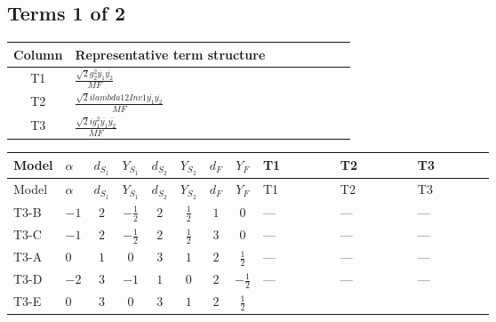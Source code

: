 \documentclass[8pt]{article}
\begin{document}
\begin{landscape}
\subsection*{Terms 1 of 2}
\begin{center}
\begin{tabular}{@{}c >{\raggedright\arraybackslash}p{0.82\linewidth}@{}}
\toprule
Column & Representative term structure \\
\midrule
T1 & \(\displaystyle \frac{\sqrt{2} g_{2}^{2} \overline{y_{1}} \overline{y_{2}}}{MF}\) \\
\midrule
T2 & \(\displaystyle \frac{\sqrt{2} i lambda12Inv1 \overline{y_{1}} \overline{y_{2}}}{MF}\) \\
\midrule
T3 & \(\displaystyle \frac{\sqrt{2} i g_{1}^{2} \overline{y_{1}} \overline{y_{2}}}{MF}\) \\
\midrule
\bottomrule
\end{tabular}
\end{center}
\smallskip
\tiny
\begin{longtable}{@{}llcccccc >{\raggedright\arraybackslash}p{0.21\linewidth} >{\raggedright\arraybackslash}p{0.21\linewidth} >{\raggedright\arraybackslash}p{0.21\linewidth}@{}}
\toprule
Model & $\alpha$ & $d_{S_1}$ & $Y_{S_1}$ & $d_{S_2}$ & $Y_{S_2}$ & $d_F$ & $Y_F$ & T1 & T2 & T3 \\
\midrule
\endfirsthead
\toprule
Model & $\alpha$ & $d_{S_1}$ & $Y_{S_1}$ & $d_{S_2}$ & $Y_{S_2}$ & $d_F$ & $Y_F$ & T1 & T2 & T3 \\
\midrule
\endhead
T3-B & $-1$ & $2$ & $-\frac{1}{2}$ & $2$ & $\frac{1}{2}$ & $1$ & $0$ & --- & --- & --- \\
\midrule
T3-C & $-1$ & $2$ & $-\frac{1}{2}$ & $2$ & $\frac{1}{2}$ & $3$ & $0$ & --- & --- & --- \\
\midrule
T3-A & $0$ & $1$ & $0$ & $3$ & $1$ & $2$ & $\frac{1}{2}$ & --- & --- & --- \\
\midrule
T3-D & $-2$ & $3$ & $-1$ & $1$ & $0$ & $2$ & $-\frac{1}{2}$ & --- & --- & --- \\
\midrule
T3-E & $0$ & $3$ & $0$ & $3$ & $1$ & $2$ & $\frac{1}{2}$ & \scriptsize\adjustbox{max width=\linewidth}{$\begin{gathered} - \frac{\sqrt{2} g_{2}^{2} \overline{y_{1}} \overline{y_{2}}}{4 MF}\end{gathered}$} & \scriptsize\adjustbox{max width=\linewidth}{$\begin{gathered} - \frac{\sqrt{2} i lambda12Inv1 \overline{y_{1}} \overline{y_{2}}}{4 MF}\end{gathered}$} & \scriptsize\adjustbox{max width=\linewidth}{$\begin{gathered} \frac{3 \sqrt{2} i g_{1}^{2} \overline{y_{1}} \overline{y_{2}}}{16 MF}\end{gathered}$} \\
\midrule
\bottomrule
\end{longtable}
\clearpage

\end{landscape}
\end{document}
